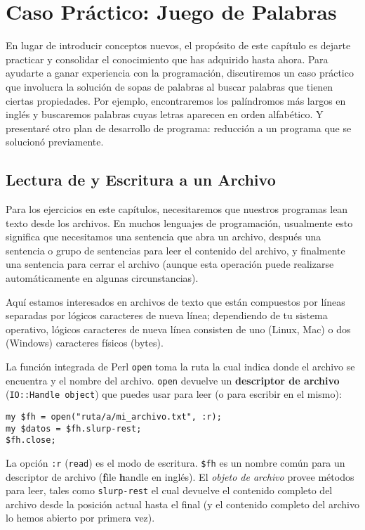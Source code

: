 
\chapter{Caso Práctico: Juego de Palabras}
\label{wordplay}

En lugar de introducir conceptos nuevos, el propósito de 
este capítulo es dejarte practicar y consolidar el conocimiento
que has adquirido hasta ahora. Para ayudarte a ganar experiencia
con la programación, discutiremos un caso práctico que involucra
la solución de sopas de palabras al buscar palabras que tienen
ciertas propiedades. Por ejemplo, encontraremos los palíndromos
más largos en inglés y buscaremos palabras cuyas letras aparecen
en orden alfabético. Y presentaré otro plan de desarrollo de programa:
reducción a un programa que se solucionó previamente.

\section{Lectura de y Escritura a un Archivo}

Para los ejercicios en este capítulos, necesitaremos que nuestros
programas lean texto desde los archivos. En muchos lenguajes 
de programación, usualmente esto significa que necesitamos una sentencia
que abra un archivo, después una sentencia o grupo de sentencias 
para leer el contenido del archivo, y finalmente una sentencia para
cerrar el archivo (aunque esta operación puede realizarse automáticamente
en algunas circunstancias).

Aquí estamos interesados en archivos de texto que están compuestos 
por líneas separadas por lógicos caracteres de nueva línea; 
dependiendo de tu sistema operativo, lógicos caracteres de nueva línea
consisten de uno (Linux, Mac) o dos (Windows) caracteres físicos (bytes).

La función integrada de Perl {\tt open} toma la ruta la cual indica donde el 
archivo se encuentra y el nombre del archivo. {\tt open} devuelve
un {\bf descriptor de archivo} ({\tt IO::Handle object}) que puedes usar
para leer (o para escribir en el mismo):

\begin{verbatim}
my $fh = open("ruta/a/mi_archivo.txt", :r);
my $datos = $fh.slurp-rest;
$fh.close;
\end{verbatim}
%
La opción {\tt :r}  ({\tt read}) es el modo de escritura. {\tt \$fh} es
un nombre común para un descriptor de archivo ({\bf f}ile {\bf h}andle en inglés).
El \emph{objeto de archivo} provee métodos para leer, tales como {\tt slurp-rest}
el cual devuelve el contenido completo del archivo desde la posición actual hasta
el final (y el contenido completo del archivo lo hemos abierto por primera vez).

